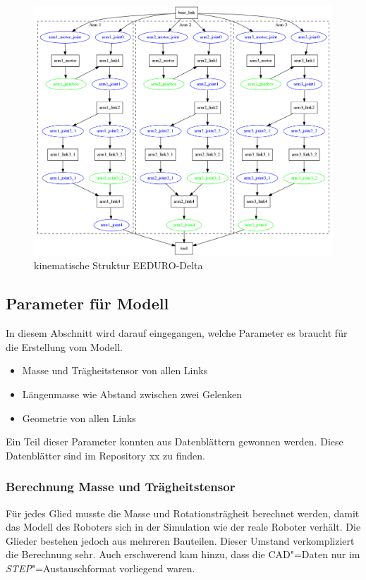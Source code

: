 \begin{figure}[ht!]
	\centering
	\includegraphics[width=14.5cm]{images/delta_struktur.png}
	\caption{kinematische Struktur EEDURO-Delta}
	\label{Ab:delta-struktur}
\end{figure}

\subsection{Parameter für Modell}
In diesem Abschnitt wird darauf eingegangen, welche Parameter es braucht für die Erstellung vom Modell.
\begin{itemize}
\item Masse und Trägheitstensor von allen Links
\item Längenmasse wie Abstand zwischen zwei Gelenken
\item Geometrie von allen Links
\end{itemize}

Ein Teil dieser Parameter konnten aus Datenblättern gewonnen werden.
Diese Datenblätter sind im Repository xx zu finden. %

\subsubsection{Berechnung Masse und Trägheitstensor}
Für jedes Glied musste die Masse und Rotationsträgheit berechnet werden, damit das Modell des Roboters sich in der Simulation wie der reale Roboter verhält.
Die Glieder bestehen jedoch aus mehreren Bauteilen.
Dieser Umstand verkompliziert die Berechnung sehr.
Auch erschwerend kam hinzu, dass die CAD"=Daten nur im \textit{STEP}"=Austauschformat vorliegend waren.

